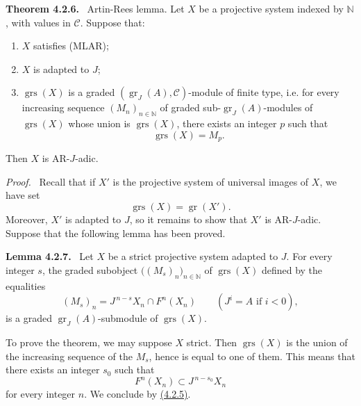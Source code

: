 \documentclass[11pt]{article}
\newenvironment{statement}[1]{\par\medskip\noindent\textbf{#1.}\ }{\par\medskip}
\newenvironment{prooftext}[1][Proof]{\par\noindent\emph{#1.}\ }{\par\medskip}
\providecommand{\gr}{\operatorname{gr}}
\providecommand{\gr}{\operatorname{gr}}
\providecommand{\gr}{\operatorname{gr}}
\providecommand{\grs}{\operatorname{grs}}
\begin{document}
\label{sga5:V:theorem:4.2.6}\begin{statement}{Theorem 4.2.6}
Artin-Rees lemma. Let \(X\) be a projective system indexed by \(\mathbb N\), with values in \(\mathcal C\). Suppose that:
\begin{enumerate}[label=\textup{(\roman*)}]
\item \(X\) satisfies (MLAR);
\item \(X\) is adapted to \(J\);
\item \(\grs(X)\) is a graded \((\gr_J(A),\mathcal C)\)-module of finite type, i.e. for every increasing sequence \((M_n)_{n\in\mathbb N}\) of graded sub-\(\gr_J(A)\)-modules of \(\grs(X)\) whose union is \(\grs(X)\), there exists an integer \(p\) such that
\[
\grs(X)=M_p.
\]
\end{enumerate}
Then \(X\) is AR-\(J\)-adic.
\end{statement}

\begin{prooftext}
Recall that if \(X'\) is the projective system of universal images of \(X\), we have set
\[
\grs(X)=\gr(X').
\]
Moreover, \(X'\) is adapted to \(J\), so it remains to show that \(X'\) is AR-\(J\)-adic. Suppose that the following lemma has been proved.
\end{prooftext}

\label{sga5:V:lemma:4.2.7}\begin{statement}{Lemma 4.2.7}
Let \(X\) be a strict projective system adapted to \(J\). For every integer \(s\), the graded subobject \(\bigl((M_s)_n\bigr)_{n\in\mathbb N}\) of \(\grs(X)\) defined by the equalities
\[
(M_s)_n=J^{\,n-s}X_n\cap F^n(X_n)\qquad(J^i=A\text{ if }i<0),
\]
is a graded \(\gr_J(A)\)-submodule of \(\grs(X)\).
\end{statement}

To prove the theorem, we may suppose \(X\) strict. Then \(\grs(X)\) is the union of the increasing sequence of the \(M_s\), hence is equal to one of them. This means that there exists an integer \(s_0\) such that
\[
F^n(X_n)\subset J^{\,n-s_0}X_n
\]
for every integer \(n\). We conclude by \hyperref[sga5:V:proposition:4.2.5]{(4.2.5)}.
\end{document}
